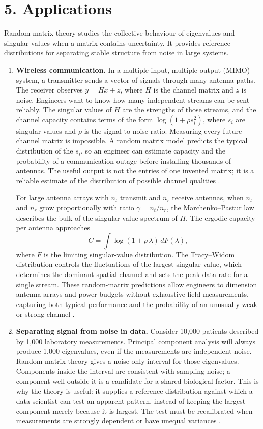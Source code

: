 \section*{5. Applications}
Random matrix theory studies the collective behaviour of eigenvalues and singular values when a matrix contains uncertainty. It provides reference distributions for separating stable structure from noise in large systems.
\begin{enumerate}[leftmargin=*,itemsep=0.7em]
\item \textbf{Wireless communication.}  In a multiple-input, multiple-output
(MIMO) system, a transmitter sends a vector of signals through many antenna
paths.  The receiver observes $y=Hx+z$, where $H$ is the channel matrix and
$z$ is noise.  Engineers want to know how many independent streams can be
sent reliably.  The singular values of $H$ are the strengths of those
streams, and the channel capacity contains terms of the form
$\log(1+\rho s_i^2)$, where $s_i$ are singular values and $\rho$ is the
signal-to-noise ratio.  Measuring every future channel matrix is impossible.
A random matrix model predicts the typical distribution of the $s_i$, so an
engineer can estimate capacity and the probability of a communication
outage before installing thousands of antennas.  The useful output is not
the entries of one invented matrix; it is a reliable estimate of the
distribution of possible channel qualities \cite{random_matrix_theory_ref1}.

For large antenna arrays with $n_t$ transmit and $n_r$ receive antennas,
when $n_t$ and $n_r$ grow proportionally with ratio $\gamma=n_t/n_r$, the
Marchenko--Pastur law describes the bulk of the singular-value spectrum of
$H$. The ergodic capacity per antenna approaches
\[
C=\int\log(1+\rho\,\lambda)\,dF(\lambda),
\]
where $F$ is the limiting singular-value distribution. The Tracy--Widom
distribution controls the fluctuations of the largest singular value, which
determines the dominant spatial channel and sets the peak data rate for a
single stream. These random-matrix predictions allow engineers to dimension
antenna arrays and power budgets without exhaustive field measurements,
capturing both typical performance and the probability of an unusually weak
or strong channel \cite{random_matrix_theory_ref1}.

\item \textbf{Separating signal from noise in data.}  Consider 10,000 patients
described by 1,000 laboratory measurements.  Principal component analysis
will always produce 1,000 eigenvalues, even if the measurements are
independent noise.  Random matrix theory gives a noise-only interval for
those eigenvalues.  Components inside the interval are consistent with
sampling noise; a component well outside it is a candidate for a shared
biological factor.  This is why the theory is useful: it supplies a
reference distribution against which a data scientist can test an apparent
pattern, instead of keeping the largest component merely because it is
largest.  The test must be recalibrated when measurements are strongly
dependent or have unequal variances \cite{random_matrix_theory_ref2}.


\end{enumerate}
